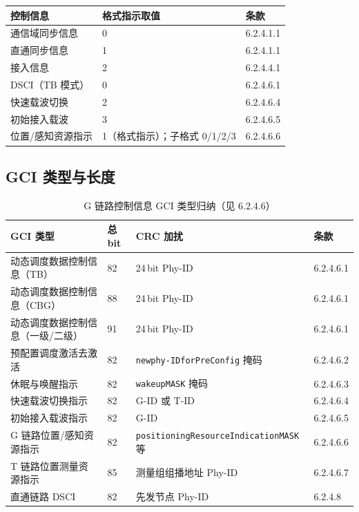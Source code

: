 \documentclass[11pt,a4paper]{ctexart}
\begin{document}
\begin{table}[h]
\centering
\small
\begin{tabular}{lll}
\toprule
\textbf{控制信息} & \textbf{格式指示取值} & \textbf{条款} \\
\midrule
通信域同步信息 & 0 & 6.2.4.1.1 \\
直通同步信息 & 1 & 6.2.4.1.1 \\
接入信息 & 2 & 6.2.4.4.1 \\
DSCI（TB 模式） & 0 & 6.2.4.6.1 \\
快速载波切换 & 2 & 6.2.4.6.4 \\
初始接入载波 & 3 & 6.2.4.6.5 \\
位置/感知资源指示 & 1（格式指示）；子格式 0/1/2/3 & 6.2.4.6.6 \\
\bottomrule
\end{tabular}
\end{table}

\subsection{GCI 类型与长度}

\begin{table}[h]
\centering
\small
\caption{G 链路控制信息 GCI 类型归纳（见 6.2.4.6）}
\begin{tabular}{L{4.5cm}lll}
\toprule
\textbf{GCI 类型} & \textbf{总 bit} & \textbf{CRC 加扰} & \textbf{条款} \\
\midrule
动态调度数据控制信息（TB） & 82 & 24\,bit Phy-ID & 6.2.4.6.1 \\
动态调度数据控制信息（CBG） & 88 & 24\,bit Phy-ID & 6.2.4.6.1 \\
动态调度数据控制信息（一级/二级） & 91 & 24\,bit Phy-ID & 6.2.4.6.1 \\
预配置调度激活去激活 & 82 & \texttt{newphy-IDforPreConfig} 掩码 & 6.2.4.6.2 \\
休眠与唤醒指示 & 82 & \texttt{wakeupMASK} 掩码 & 6.2.4.6.3 \\
快速载波切换指示 & 82 & G-ID 或 T-ID & 6.2.4.6.4 \\
初始接入载波指示 & 82 & G-ID & 6.2.4.6.5 \\
G 链路位置/感知资源指示 & 82 & \texttt{positioningResourceIndicationMASK} 等 & 6.2.4.6.6 \\
T 链路位置测量资源指示 & 85 & 测量组组播地址 Phy-ID & 6.2.4.6.7 \\
直通链路 DSCI & 82 & 先发节点 Phy-ID & 6.2.4.8 \\
\bottomrule
\end{tabular}
\end{table}
\end{document}
